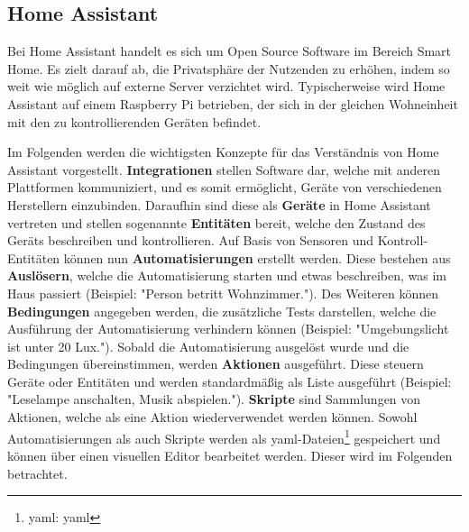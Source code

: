 \subsection{Home Assistant}

Bei Home Assistant handelt es sich um Open Source Software im Bereich Smart Home. Es zielt darauf
ab, die Privatsphäre der Nutzenden zu erhöhen, indem so weit wie möglich auf externe Server
verzichtet wird. Typischerweise wird Home Assistant auf einem Raspberry Pi betrieben, der sich in
der gleichen Wohneinheit  mit den zu kontrollierenden Geräten befindet.
\parencite{homeassistantHomeAssistant}

Im Folgenden werden die wichtigsten Konzepte für das Verständnis von Home Assistant vorgestellt.
\textbf{Integrationen} stellen Software dar, welche mit anderen Plattformen kommuniziert, und es
somit ermöglicht, Geräte von verschiedenen Herstellern einzubinden. Daraufhin sind diese als
\textbf{Geräte} in Home Assistant vertreten und stellen sogenannte \textbf{Entitäten} bereit, welche
den Zustand des Geräts beschreiben und kontrollieren. Auf Basis von Sensoren und Kontroll-Entitäten
können nun \textbf{Automatisierungen} erstellt werden. Diese bestehen aus \textbf{Auslösern}, welche
die Automatisierung starten und etwas beschreiben, was im Haus passiert (Beispiel: "Person
betritt Wohnzimmer."). Des Weiteren können \textbf{Bedingungen} angegeben werden, die zusätzliche
Tests darstellen, welche die Ausführung der Automatisierung verhindern können (Beispiel:
"Umgebungslicht ist unter 20 Lux."). Sobald die Automatisierung ausgelöst wurde und die Bedingungen
übereinstimmen, werden \textbf{Aktionen} ausgeführt. Diese steuern Geräte oder Entitäten und werden
standardmäßig als Liste ausgeführt (Beispiel: "Leselampe anschalten, Musik abspielen.").
\textbf{Skripte} sind Sammlungen von Aktionen, welche als eine Aktion wiederverwendet werden können.
\parencite{homeassistantConceptsTerminology} Sowohl Automatisierungen als auch Skripte werden als
\acs{yaml}-Dateien\footnote{\acs{yaml}: \acl{yaml}} gespeichert und können über einen visuellen
Editor bearbeitet werden. Dieser wird im Folgenden betrachtet.

